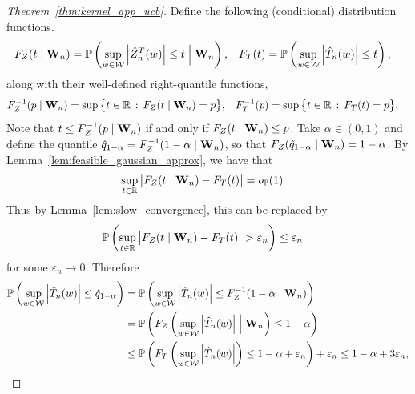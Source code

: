 \begin{proof}[Theorem~\ref{thm:kernel_app_ucb}]
  Define the following (conditional) distribution functions.
  \begin{align*}
    F_Z(t \mid \mathbf{W}_n)
    &=
    \mathbb{P}\left(
      \sup_{w \in \mathcal{W}}
      \left| \hat Z_n^T(w) \right|
      \leq t
      \Bigm\vert \mathbf{W}_n
    \right),
    &F_T(t)
    &=
    \mathbb{P}\left(
      \sup_{w \in \mathcal{W}}
      \left| \hat T_n(w) \right|
      \leq t
    \right),
  \end{align*}
  along with their well-defined right-quantile functions,
  \begin{align*}
    F_Z^{-1}(p \mid \mathbf{W}_n)
    &=
    \sup
    \big\{
      t \in \mathbb{R}
      \, : \,
      F_Z(t \mid \mathbf{W}_n)
      = p
    \big\},
    &F_T^{-1}(p)
    &=
    \sup
    \big\{
      t \in \mathbb{R}
      \, : \,
      F_T(t)
      = p
    \big\}.
  \end{align*}
  Note that
  $t \leq F_Z^{-1}(p \mid \mathbf{W}_n)$
  if and only if
  $F_Z(t \mid \mathbf{W}_n) \leq p$.
  Take $\alpha \in (0,1)$ and
  define the quantile
  $\hat q_{1-\alpha} = F_Z^{-1}(1-\alpha \mid \mathbf{W}_n)$,
  so that
  $F_Z(\hat q_{1-\alpha} \mid \mathbf{W}_n) = 1-\alpha$.
  By Lemma~\ref{lem:feasible_gaussian_approx},
  we have that
  \begin{align*}
    \sup_{t \in \mathbb{R}}
    \big|
    F_Z(t \mid \mathbf{W}_n) - F_T(t)
    \big|
    &=
    o_{\mathbb{P}}(1)
  \end{align*}
  Thus by Lemma~\ref{lem:slow_convergence},
  this can be replaced by
  \begin{align*}
    \mathbb{P}\left(
      \sup_{t \in \mathbb{R}} \big| F_Z(t \mid \mathbf{W}_n) - F_T(t) \big|
      > \varepsilon_n
    \right)
    &\leq \varepsilon_n
  \end{align*}
  for some $\varepsilon_n \to 0$.
  Therefore
  \begin{align*}
    \mathbb{P}\left(
      \sup_{w \in \mathcal{W}}
      \left|
      \hat T_n(w)
      \right|
      \leq
      \hat q_{1-\alpha}
    \right)
    &=
    \mathbb{P}\left(
      \sup_{w \in \mathcal{W}}
      \left|
      \hat T_n(w)
      \right|
      \leq
      F_Z^{-1}(1-\alpha \mid \mathbf{W}_n)
    \right) \\
    &=
    \mathbb{P}\left(
      F_Z\left(
        \sup_{w \in \mathcal{W}}
        \left|
        \hat T_n(w)
        \right|
        \Bigm\vert \mathbf{W}_n
      \right)
      \leq
      1 - \alpha
    \right) \\
    &\leq
    \mathbb{P}\left(
      F_T\left(
        \sup_{w \in \mathcal{W}}
        \left|
        \hat T_n(w)
        \right|
      \right)
      \leq
      1 - \alpha + \varepsilon_n
    \right)
    + \varepsilon_n
    \leq 1 - \alpha + 3\varepsilon_n,
  \end{align*}

\end{proof}
